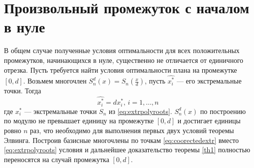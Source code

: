 \documentclass[specialist,
               substylefile = spbu.rtx,
               subf,href,colorlinks=true, 12pt]{disser}
\theoremstyle{definition}
\begin{document}
	\section{Произвольный промежуток с началом в нуле}
	\label{sec:0d}
	
	В общем случае полученные условия оптимальности для всех положительных промежутков, начинающихся в нуле, существенно не отличается от единичного отрезка. Пусть требуется найти условия оптимальности плана на промежутке $[0, d]$. Возьмем многочлен $S_n^d(x) = S_n(\frac{x}{d})$, пусть $\widehat{x_i^*}$ --- его экстремальные точки. Тогда
	\begin{equation}
	\label{eq:coorectedextr}
		\widehat{x_i^*} = d x_i^*, \, i = 1, \ldots, n
	\end{equation}
	где $x_i^*$ --- экстремальные точки $S_n$ из \eqref{eq:extrpolyroots}. $S_n^d(x)$ по построению по модулю не превышает единицу на промежутке $[0, d]$ и достигает единицы ровно $n$ раз, что необходимо для выполнения первых двух условий теоремы Элвинга. Построив базисные многочлены по точкам \eqref{eq:coorectedextr} вместо \eqref{eq:extrpolyroots} условия и дальнейшее доказательство теоремы \ref{th1} полностью переносятся на случай промежутка $[0, d]$.
	
	
\end{document}
